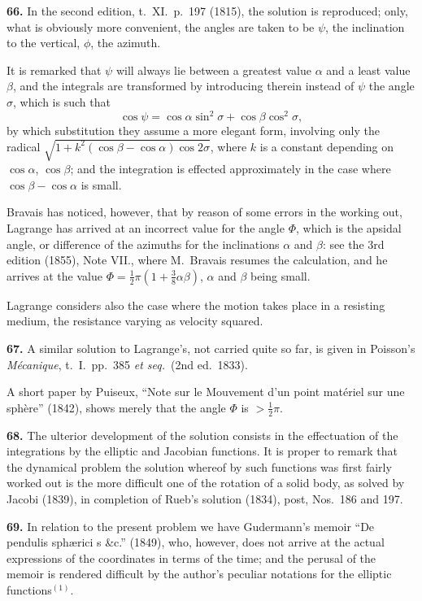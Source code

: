 \documentclass[11pt,a4paper]{book}
\begin{document}
\textbf{66.} In the second edition, t.~XI.~p.~197 (1815), the solution is reproduced; only, what is obviously more convenient, the angles are taken to be $\psi$, the inclination to the vertical, $\phi$, the azimuth.

It is remarked that $\psi$ will always lie between a greatest value $\alpha$ and a least value $\beta$, and the integrals are transformed by introducing therein instead of $\psi$ the angle $\sigma$, which is such that
\[
\cos\psi = \cos\alpha \sin^2\sigma + \cos\beta \cos^2\sigma,
\]
by which substitution they assume a more elegant form, involving only the radical $\sqrt{1 + k^2(\cos\beta - \cos\alpha)\cos 2\sigma}$, where $k$ is a constant depending on $\cos\alpha$, $\cos\beta$; and the integration is effected approximately in the case where $\cos\beta - \cos\alpha$ is small.

Bravais has noticed, however, that by reason of some errors in the working out, Lagrange has arrived at an incorrect value for the angle $\Phi$, which is the apsidal angle, or difference of the azimuths for the inclinations $\alpha$ and $\beta$: see the 3rd edition (1855), Note VII., where M.~Bravais resumes the calculation, and he arrives at the value $\Phi = \frac{1}{2}\pi(1 + \frac{3}{8}\alpha\beta)$, $\alpha$ and $\beta$ being small.

Lagrange considers also the case where the motion takes place in a resisting medium, the resistance varying as velocity squared.

\textbf{67.} A similar solution to Lagrange's, not carried quite so far, is given in Poisson's \textit{M\'ecanique}, t.~I.~pp.~385 \textit{et seq.}~(2nd ed.~1833).

A short paper by Puiseux, ``Note sur le Mouvement d'un point mat\'eriel sur une sph\`ere'' (1842), shows merely that the angle $\Phi$ is $> \frac{1}{2}\pi$.

\textbf{68.} The ulterior development of the solution consists in the effectuation of the integrations by the elliptic and Jacobian functions. It is proper to remark that the dynamical problem the solution whereof by such functions was first fairly worked out is the more difficult one of the rotation of a solid body, as solved by Jacobi (1839), in completion of Rueb's solution (1834), post, Nos.~186 and 197.

\textbf{69.} In relation to the present problem we have Gudermann's memoir ``De pendulis sph\ae rici s \&c.'' (1849), who, however, does not arrive at the actual expressions of the coordinates in terms of the time; and the perusal of the memoir is rendered difficult by the author's peculiar notations for the elliptic functions$^{(1)}$.
\end{document}
